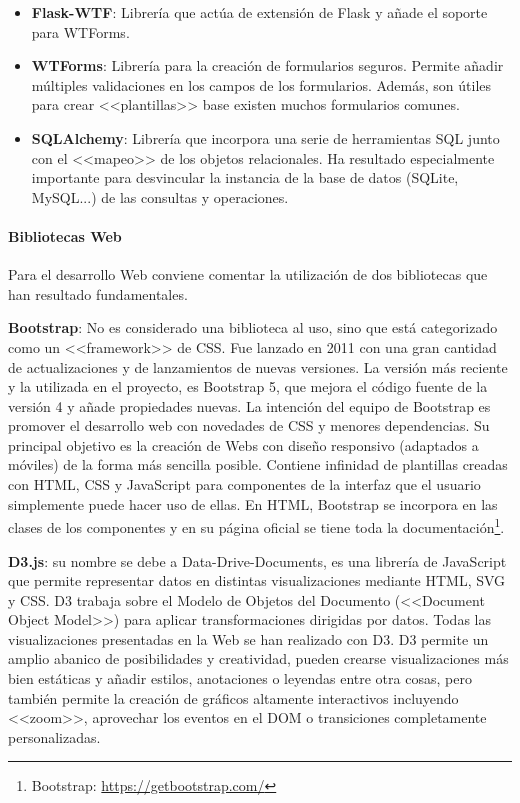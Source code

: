 \begin{itemize}
	\item \textbf{Flask-WTF}: Librería que actúa de extensión de Flask y añade
	el soporte para WTForms.
	\item \textbf{WTForms}: Librería para la creación de formularios seguros.
	Permite añadir múltiples validaciones en los campos de los formularios.
	Además, son útiles para crear <<plantillas>> base existen muchos formularios
	comunes.
	\item \textbf{SQLAlchemy}: Librería que incorpora una serie de herramientas
	SQL junto con el <<mapeo>> de los objetos relacionales. Ha resultado
	especialmente importante para desvincular la instancia de la base de datos
	(SQLite, MySQL...) de las consultas y operaciones.
\end{itemize}

\paragraph{Bibliotecas Web} Para el desarrollo Web conviene comentar la
utilización de dos bibliotecas que han resultado fundamentales.

\textbf{Bootstrap}: No es considerado una biblioteca al uso, sino que está
categorizado como un <<framework>> de CSS. Fue lanzado en 2011 con una gran
cantidad de actualizaciones y de lanzamientos de nuevas versiones. La versión
más reciente y la utilizada en el proyecto, es Bootstrap 5, que mejora el código
fuente de la versión 4 y añade propiedades nuevas. La intención del equipo de
Bootstrap es promover el desarrollo web con novedades de CSS y menores
dependencias. Su principal objetivo es la creación de Webs con diseño responsivo
(adaptados a móviles) de la forma más sencilla posible. Contiene infinidad de
plantillas creadas con HTML, CSS y JavaScript para componentes de la interfaz
que el usuario simplemente puede hacer uso de ellas. En HTML, Bootstrap se
incorpora en las clases de los componentes y en su página oficial se tiene toda
la documentación\footnote{Bootstrap: \url{https://getbootstrap.com/}}.

\textbf{D3.js}: su nombre se debe a Data-Drive-Documents, es una librería de
JavaScript que permite representar datos en distintas visualizaciones mediante
HTML, SVG y CSS. D3 trabaja sobre el Modelo de Objetos del Documento (<<Document
Object Model>>) para aplicar transformaciones dirigidas por datos. Todas las
visualizaciones presentadas en la Web se han realizado con D3. D3 permite un
amplio abanico de posibilidades y creatividad, pueden crearse visualizaciones
más bien estáticas y añadir estilos, anotaciones o leyendas entre otra cosas,
pero también permite la creación de gráficos altamente interactivos incluyendo
<<zoom>>, aprovechar los eventos en el DOM o transiciones completamente
personalizadas.

